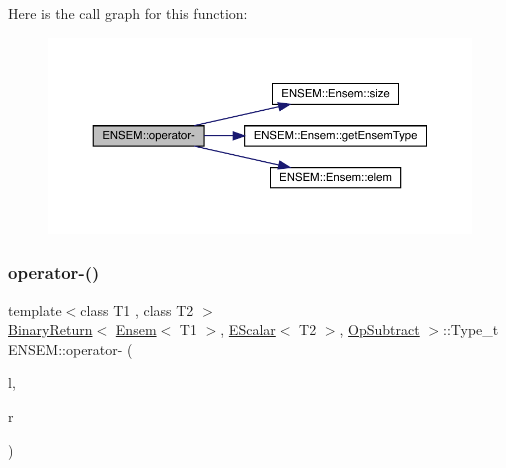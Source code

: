 Here is the call graph for this function\+:\nopagebreak
\begin{figure}[H]
\begin{center}
\leavevmode
\includegraphics[width=350pt]{d1/d9e/group__eensem_gaa7400c6ebea61c6e2869c81ab28d68b0_cgraph}
\end{center}
\end{figure}
\mbox{\label{group__eensem_ga2ca6914217df099912f3f38239141a55}} 
\subsubsection{\texorpdfstring{operator-\/()}{operator-()}\hspace{0.1cm}{\footnotesize\ttfamily [3/4]}}
{\footnotesize\ttfamily template$<$class T1 , class T2 $>$ \\
\mbox{\hyperlink{structENSEM_1_1BinaryReturn}{Binary\+Return}}$<$ \mbox{\hyperlink{classENSEM_1_1Ensem}{Ensem}}$<$ T1 $>$, \mbox{\hyperlink{classENSEM_1_1EScalar}{E\+Scalar}}$<$ T2 $>$, \mbox{\hyperlink{structENSEM_1_1OpSubtract}{Op\+Subtract}} $>$\+::Type\+\_\+t E\+N\+S\+E\+M\+::operator-\/ (\begin{DoxyParamCaption}\item[{const \mbox{\hyperlink{classENSEM_1_1Ensem}{Ensem}}$<$ T1 $>$ \&}]{l,  }\item[{const \mbox{\hyperlink{classENSEM_1_1EScalar}{E\+Scalar}}$<$ T2 $>$ \&}]{r }\end{DoxyParamCaption})\hspace{0.3cm}{\ttfamily [inline]}}

